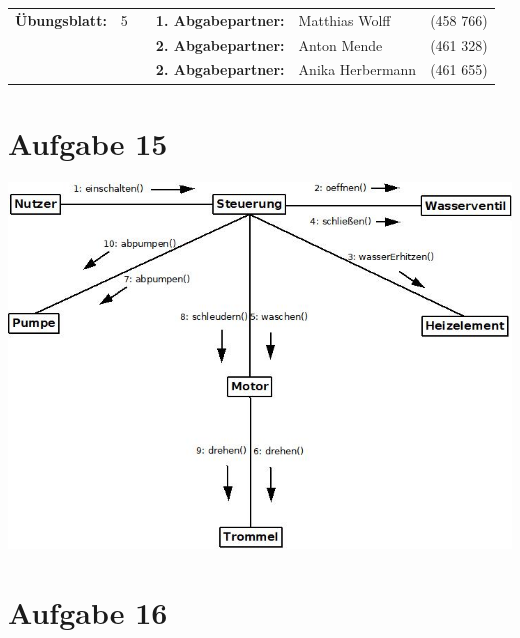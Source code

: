 \newcommand{\obenlinks}{Software Engineering}		%

\usepackage{listings}


	\begin{center}
		\begin{tabular}{|rlp{4cm}rll|}
		\hline
		 \textbf{Übungsblatt:} & 5 &   & \textbf{1. Abgabepartner:} & Matthias Wolff & (458 766)  \\
		        & & & \textbf{2. Abgabepartner:} & Anton Mende & (461 328) \\
		        & & & \textbf{2. Abgabepartner:} & Anika Herbermann & (461 655) \\ \hline
		\end{tabular}
	\end{center}
\section*{Aufgabe 15}	
\includegraphics[scale=0.7]{Aufgabe_15.jpeg}
\newpage
\section*{Aufgabe 16}
